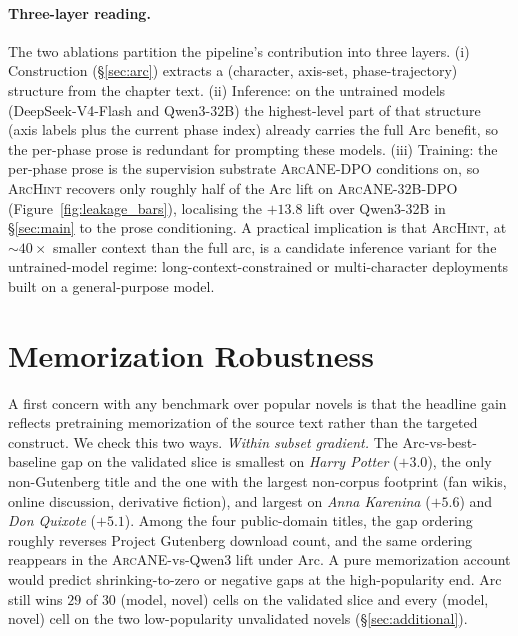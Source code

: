 \documentclass{llmxive}
\providecommand{\ours}{\textsc{ArcANE}}
\begin{document}
\paragraph{Three-layer reading.}
The two ablations partition the pipeline's contribution into three layers. (i) Construction (\S\ref{sec:arc}) extracts a (character, axis-set, phase-trajectory) structure from the chapter text. (ii) Inference: on the untrained models (DeepSeek-V4-Flash and Qwen3-32B) the highest-level part of that structure (axis labels plus the current phase index) already carries the full Arc benefit, so the per-phase prose is redundant for prompting these models. (iii) Training: the per-phase prose is the supervision substrate \ours{}-DPO conditions on, so \textsc{ArcHint} recovers only roughly half of the Arc lift on \ours{}-32B-DPO (Figure~\ref{fig:leakage_bars}), localising the $+13.8$ lift over Qwen3-32B in \S\ref{sec:main} to the prose conditioning. A practical implication is that \textsc{ArcHint}, at $\sim 40\times$ smaller context than the full arc, is a candidate inference variant for the untrained-model regime: long-context-constrained or multi-character deployments built on a general-purpose model.

\section{Memorization Robustness\label{app:memorization}}

A first concern with any benchmark over popular novels is that the headline gain reflects pretraining memorization of the source text rather than the targeted construct. We check this two ways. \emph{Within subset gradient.} The Arc-vs-best-baseline gap on the validated slice is smallest on \emph{Harry Potter} ($+3.0$), the only non-Gutenberg title and the one with the largest non-corpus footprint (fan wikis, online discussion, derivative fiction), and largest on \emph{Anna Karenina} ($+5.6$) and \emph{Don Quixote} ($+5.1$). Among the four public-domain titles, the gap ordering roughly reverses Project Gutenberg download count, and the same ordering reappears in the \ours{}-vs-Qwen3 lift under Arc. A pure memorization account would predict shrinking-to-zero or negative gaps at the high-popularity end. Arc still wins $29$ of $30$ (model, novel) cells on the validated slice and every (model, novel) cell on the two low-popularity unvalidated novels (\S\ref{sec:additional}).

\end{document}
